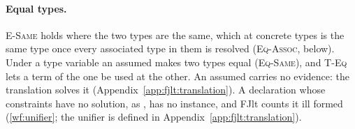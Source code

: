 \paragraph{Equal types.}
\textsc{E-Same} holds where the two types are the same, which at concrete types is the same type once every associated type in them is resolved (\textsc{Eq-Assoc}, below).
Under a type variable an assumed  makes two types equal (\textsc{Eq-Same}), and \textsc{T-Eq} lets a term of the one be used at the other.
An assumed  carries no evidence: the translation solves it (Appendix~\ref{app:fjlt:translation}).
A declaration whose  constraints have no solution, as , has no instance, and FJlt counts it ill formed (\ref{wf:unifier}; the unifier is defined in Appendix~\ref{app:fjlt:translation}).


